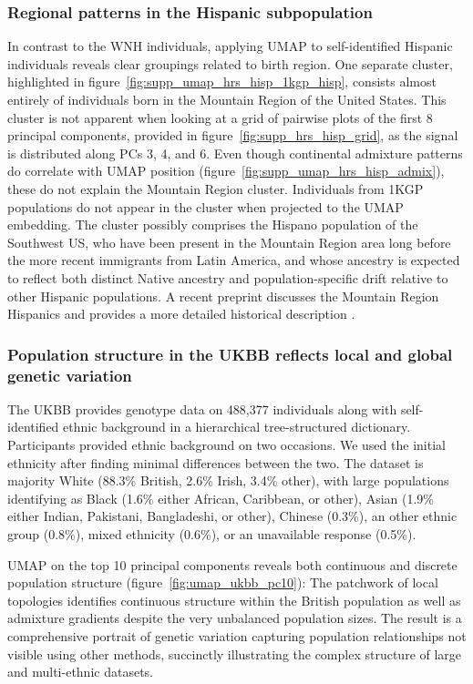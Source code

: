 \documentclass[12pt]{pnas-new}
\begin{document}
\subsubsection*{Regional patterns in the Hispanic subpopulation} In contrast to the WNH individuals, applying UMAP to self-identified Hispanic individuals reveals clear groupings related to birth region. One separate cluster, highlighted in figure~\ref{fig:supp_umap_hrs_hisp_1kgp_hisp}, consists almost entirely of individuals born in the Mountain Region of the United States. This cluster is not apparent when looking at a grid of pairwise plots of the first 8 principal components, provided in figure~\ref{fig:supp_hrs_hisp_grid}, as the signal is distributed along PCs 3, 4, and 6. Even though continental admixture patterns do correlate with UMAP position (figure~\ref{fig:supp_umap_hrs_hisp_admix}), these do not explain the Mountain Region cluster. Individuals from 1KGP populations do not appear in the cluster when projected to the UMAP embedding. The cluster possibly comprises the Hispano population of the Southwest US, who have been present in the Mountain Region area long before the more recent immigrants from Latin America, and whose ancestry is expected to reflect both distinct Native ancestry and population-specific drift relative to other Hispanic populations. A recent preprint discusses the Mountain Region Hispanics and provides a more detailed historical description \cite{Jordan333609}.  

\subsubsection*{Population structure in the UKBB reflects local and global genetic variation} The UKBB provides genotype data on 488,377 individuals along with self-identified ethnic background in a hierarchical tree-structured dictionary. Participants provided ethnic background on two occasions. We used the initial ethnicity after finding minimal differences between the two. The dataset is majority White (88.3\% British, 2.6\% Irish, 3.4\% other), with large populations identifying as Black (1.6\% either African, Caribbean, or other), Asian (1.9\% either Indian, Pakistani, Bangladeshi, or other), Chinese (0.3\%), an other ethnic group (0.8\%), mixed ethnicity (0.6\%), or an unavailable response (0.5\%). 

UMAP on the top 10 principal components reveals both continuous and discrete population structure (figure~\ref{fig:umap_ukbb_pc10}): The patchwork of local topologies identifies continuous structure within the British population as well as admixture gradients despite the very unbalanced population sizes. The result is a comprehensive portrait of genetic variation capturing population relationships not visible using other methods, succinctly illustrating the complex structure of large and multi-ethnic datasets.
\end{document}

